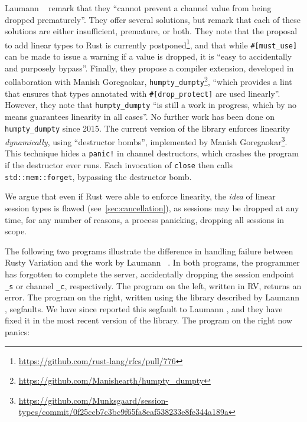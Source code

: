 \documentclass[copyright,creativecommons]{eptcs}
\begin{document}
Laumann \etal~\cite{jespersen2015} remark that they ``cannot prevent a channel value from being dropped prematurely''. They offer several solutions, but remark that each of these solutions are either insufficient, premature, or both. They note that the proposal to add linear types to Rust is currently postponed\footnote{\url{https://github.com/rust-lang/rfcs/pull/776}}, and that while \lstinline{#[must_use]} can be made to issue a warning if a value is dropped, it is ``easy to accidentally and purposely bypass''. Finally, they propose a compiler extension, developed in collaboration with Manish Goregaokar, \lstinline{humpty_dumpty}\footnote{\url{https://github.com/Manishearth/humpty_dumpty}}, ``which provides a lint that ensures that types annotated  with \lstinline{#[drop_protect]} are used linearly''. However, they note that \lstinline{humpty_dumpty} ``is still a work in progress, which by no means guarantees linearity in all cases''. No further work has been done on \lstinline{humpty_dumpty} since 2015. The current version of the library enforces linearity \emph{dynamically}, using ``destructor bombs'', implemented by Manish Goregaokar\footnote{\url{https://github.com/Munksgaard/session-types/commit/0f25ccb7c3bc9f65fa8eaf538233e8fe344a189a}}. This technique hides a \lstinline{panic!} in channel destructors, which crashes the program if the destructor ever runs. Each invocation of \lstinline{close} then calls \lstinline{std::mem::forget}, bypassing the destructor bomb.

We argue that even if Rust were able to enforce linearity, the \emph{idea} of linear session types is flawed (see~\cref{sec:cancellation}), as sessions may be dropped at any time, for any number of reasons, \eg a process panicking, dropping all sessions in scope.

The following two programs illustrate the difference in handling failure between Rusty Variation and the work by Laumann \etal~\cite{jespersen2015}. In both programs, the programmer has forgotten to complete the server, accidentally dropping the session endpoint \lstinline{_s} or channel \lstinline{_c}, respectively. The program on the left, written in RV, returns an error. The program on the right, written using the library described by Laumann \etal\cite{jespersen2015}, segfaults. We have since reported this segfault to Laumann \etal, and they have fixed it in the most recent version of the library. The program on the right now panics:
\end{document}
